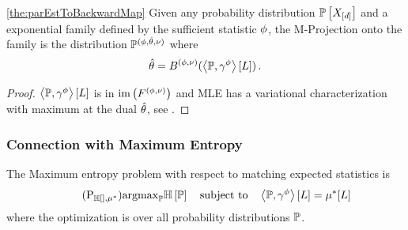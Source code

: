 \begin{theorem}\ref{the:parEstToBackwardMap}
	Given any probability distribution $\mathbb{P}\left[X_{[d]}\right]$ and a exponential family defined by the sufficient statistic $\phi$, the M-Projection onto the family is the distribution $\mathbb{P}^{(\phi,\hat{\theta},\nu)}$ where
	\begin{align*}
		\hat{\theta} = B^{(\phi,\nu)}(\left\langle \mathbb{P},\gamma^{\phi}\right\rangle \left[ L \right]) \, .
	\end{align*}
\end{theorem}
\begin{proof}
	$\left\langle \mathbb{P},\gamma^{\phi}\right\rangle \left[ L \right]$ is in $\mathrm{im}\left(F^{(\phi,\nu)}\right)$ and MLE has a variational characterization with maximum at the dual $\hat{\theta}$, see \cite{wainwright_graphical_2008}.
\end{proof}





\subsubsection{Connection with Maximum Entropy}\label{sec:maxEntDuality}


The Maximum entropy problem with respect to matching expected statistics is
\begin{align}\tag{$\mathrm{P}_{\sentropyof{}, \genmean}$}\label{prob:maxEntropy}
	\argmax_{\probtensor} \sentropyof{\probtensor} \quad \text{subject to} \quad 
	 \sbcontractionof{\probtensor,\sencsstat}{\selvariable} =  \genmeanat{\selvariable}
\end{align}
where the optimization is over all probability distributions $\mathbb{P}$.


